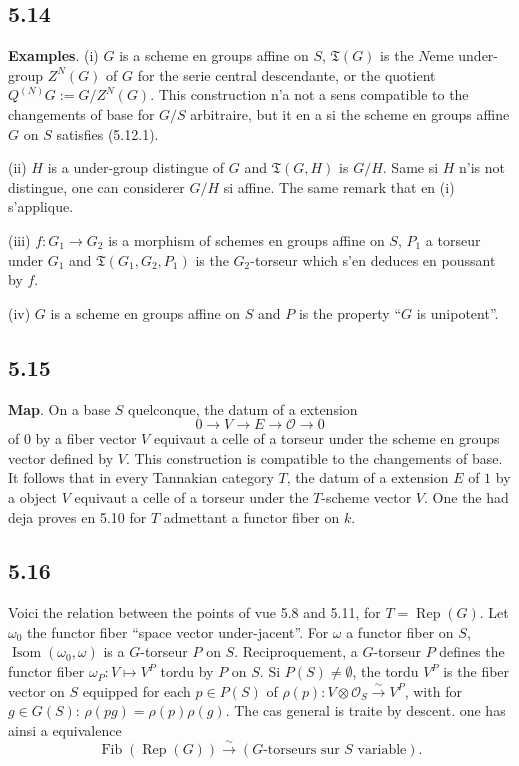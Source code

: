 \documentclass[12pt,a4paper]{article}
\theoremstyle{plain}
\theoremstyle{definition}
\theoremstyle{remark}
\DeclareMathOperator{\Rep}{Rep}
\DeclareMathOperator{\Isom}{Isom}
\DeclareMathOperator{\Fib}{Fib}
\begin{document}
\subsection*{5.14}
\textbf{Examples}. (i) $G$ is a scheme en groups affine on $S$, $\mathfrak{T}(G)$ is the $N$eme under-group $Z^N(G)$ of $G$ for the serie central descendante, or the quotient $Q^{(N)}G := G/Z^N(G)$. This construction n'a not a sens compatible to the changements of base for $G/S$ arbitraire, but it en a si the scheme en groups affine $G$ on $S$ satisfies (5.12.1).

(ii) $H$ is a under-group distingue of $G$ and $\mathfrak{T}(G,H)$ is $G/H$. Same si $H$ n'is not distingue, one can considerer $G/H$ si affine. The same remark that en (i) s'applique.

(iii) $f: G_1 
\to G_2$ is a morphism of schemes en groups affine on $S$, $P_1$ a torseur under $G_1$ and $\mathfrak{T}(G_1,G_2,P_1)$ is the $G_2$-torseur which s'en deduces en poussant by $f$.

(iv) $G$ is a scheme en groups affine on $S$ and $P$ is the property ``$G$ is unipotent''.

\subsection*{5.15}
\textbf{Map}. On a base $S$ quelconque, the datum of a extension
\[
0 
\longrightarrow V 
\longrightarrow E 
\longrightarrow 
\mathcal{O} 
\longrightarrow 0
\]
of $0$ by a fiber vector $V$ equivaut a celle of a torseur under the scheme en groups vector defined by $V$. This construction is compatible to the changements of base. It follows that in every Tannakian category $T$, the datum of a extension $E$ of $1$ by a object $V$ equivaut a celle of a torseur under the $T$-scheme vector $V$. One the had deja proves en 5.10 for $T$ admettant a functor fiber on $k$.

\subsection*{5.16}
Voici the relation between the points of vue 5.8 and 5.11, for $T = 
\Rep(G)$. Let $\omega_0$ the functor fiber ``space vector under-jacent''. For $\omega$ a functor fiber on $S$, $\Isom(\omega_0,\omega)$ is a $G$-torseur $P$ on $S$. Reciproquement, a $G$-torseur $P$ defines the functor fiber $\omega_P: V 
\mapsto V^P$ tordu by $P$ on $S$. Si $P(S) 
\neq 
\emptyset$, the tordu $V^P$ is the fiber vector on $S$ equipped for each $p 
\in P(S)$ of $\rho(p): V 
\otimes 
\mathcal{O}_S 
\xrightarrow{\sim} V^P$, with for $g 
\in G(S)$: $\rho(pg) = 
\rho(p)
\rho(g)$. The cas general is traite by descent. one has ainsi a equivalence
\[
\Fib(\Rep(G)) 
\xrightarrow{\sim} (G\text{-torseurs sur } S \text{ variable}).
\]
\end{document}
